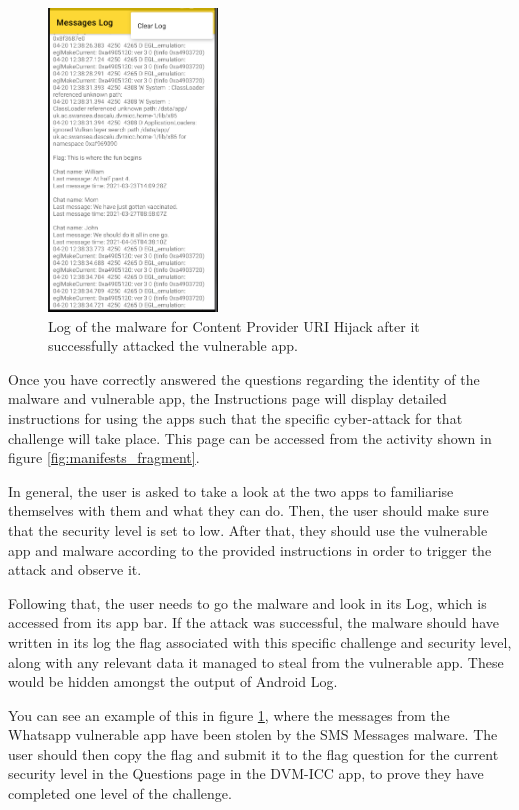     \begin{figure}
        \centering
        \includegraphics[width=0.4\textwidth]{graphics/log.PNG}
        \caption{Log of the malware for Content Provider URI Hijack after it successfully attacked the vulnerable app.}
        \label{fig:malware_log}
    \end{figure}
    
    Once you have correctly answered the questions regarding the identity of the malware and vulnerable app, the Instructions page will display detailed instructions for using the apps such that the specific cyber-attack for that challenge will take place. This page can be accessed from the activity shown in figure \ref{fig:manifests_fragment}.
    
    In general, the user is asked to take a look at the two apps to familiarise themselves with them and what they can do. Then, the user should make sure that the security level is set to low. After that, they should use the vulnerable app and malware according to the provided instructions in order to trigger the attack and observe it. 
    
    Following that, the user needs to go the malware and look in its Log, which is accessed from its app bar. If the attack was successful, the malware should have written in its log the flag associated with this specific challenge and security level, along with any relevant data it managed to steal from the vulnerable app. These would be hidden amongst the output of Android Log. 
    
    You can see an example of this in figure \ref{fig:malware_log}, where the messages from the Whatsapp vulnerable app have been stolen by the SMS Messages malware. The user should then copy the flag and submit it to the flag question for the current security level in the Questions page in the DVM-ICC app, to prove they have completed one level of the challenge. 
    
